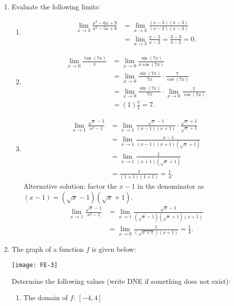 \documentclass[12pt]{article}
\begin{document}
 \begin{enumerate}
 \item  Evaluate the following limits:
\begin{enumerate}
 \item \begin{align*}
 \lim_{x\to 3} \frac{x^2-6x+9}{x^2-5x+6} & = \lim_{x\to 3}\frac{(x-3)(x-3)}{(x-2)(x-3)}\\
 & = \lim_{x\to 3}\frac{x-3}{x-2} = \frac{3-3}{3-2}=0.
\end{align*}  

 \item \begin{align*}
 \lim_{x\to 0}\frac{\tan(7x)}{x}& = \lim_{x\to 0}\frac{\sin(7x)}{x\cos(7x)}\\
 & = \lim_{x\to 0}\frac{\sin(7x)}{7x}\cdot\frac{7}{\cos(7x)}\\
 & = \lim_{x\to 0}\frac{\sin(7x)}{7x}\cdot \lim_{x\to 0}\frac{7}{\cos(7x)}\\
 & = (1)\frac{7}{1} = 7.
 \end{align*} 

 \item \begin{align*}
 \lim_{x\to 1}\frac{\sqrt{x}-1}{x^2-1} & = \lim_{x\to 1}\frac{\sqrt{x}-1}{(x-1)(x+1)}\cdot\frac{\sqrt{x}+1}{\sqrt{x}+1}\\
 & = \lim_{x\to 1}\frac{x-1}{(x-1)(x+1)(\sqrt{x}+1)}\\
 & = \lim_{x\to 1}\frac{1}{(x+1)(\sqrt{x}+1)}\\
 & = \frac{1}{(1+1)(1+1)} = \frac{1}{4}.
 \end{align*}
Alternative solution: factor the $x-1$ in the denominator as $(x-1)=(\sqrt{x}-1)(\sqrt{x}+1)$.
\begin{align*}
\lim_{x\to 1}\frac{\sqrt{x}-1}{x^2-1}& = \lim_{x\to 1}\frac{\sqrt{x}-1}{(\sqrt{x}-1)(\sqrt{x}+1)(x+1)}\\
& = \lim_{x\to 0}\frac{1}{(\sqrt{x+1})(x+1)} = \frac{1}{4}.
\end{align*}
\end{enumerate}
\newpage

\item The graph of a function $f$ is given below: 

\begin{center}
 \texttt{[image: FE-3]}
\end{center}


Determine the following values (write DNE if something does not exist):
\begin{multicols}{2}
\begin{enumerate}
 \item The domain of $f$: \underline{\hspace{1cm}$[-4,4]$\hspace{1cm}}
 

\end{enumerate}
\end{multicols}
\end{enumerate}
\end{document}
